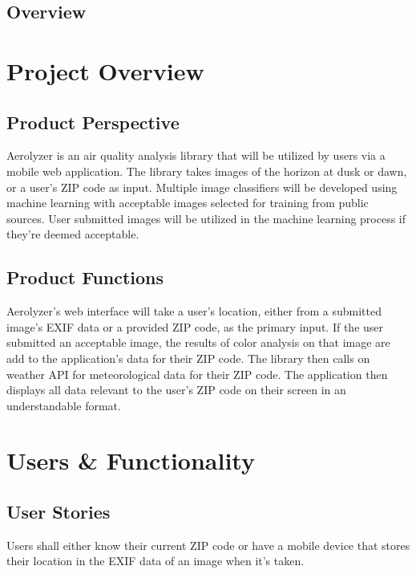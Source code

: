 \documentclass[journal,10pt,draftclsnofoot,onecolumn]{IEEEtran}
\begin{document}
\begin{singlespace}
\subsection{Overview}


\clearpage

\section{Project Overview}

\subsection{Product Perspective}
Aerolyzer is an air quality analysis library that will be utilized by users via a mobile web application.
The library takes images of the horizon at dusk or dawn, or a user's ZIP code as input.
Multiple image classifiers will be developed using machine learning with acceptable images selected for training from public sources.
User submitted images will be utilized in the machine learning process if they're deemed acceptable. 

\subsection{Product Functions}
Aerolyzer's web interface will take a user's location, either from a submitted image's EXIF data or a provided ZIP code, as the primary input.
If the user submitted an acceptable image, the results of color analysis on that image are add to the application's data for their ZIP code.
The library then calls on weather API for meteorological data for their ZIP code.
The application then displays all data relevant to the user's ZIP code on their screen in an understandable format.

\section{Users \& Functionality}
\subsection{User Stories}
Users shall either know their current ZIP code or have a mobile device that stores their location in the EXIF data of an image when it's taken.



\end{singlespace}
\end{document}
